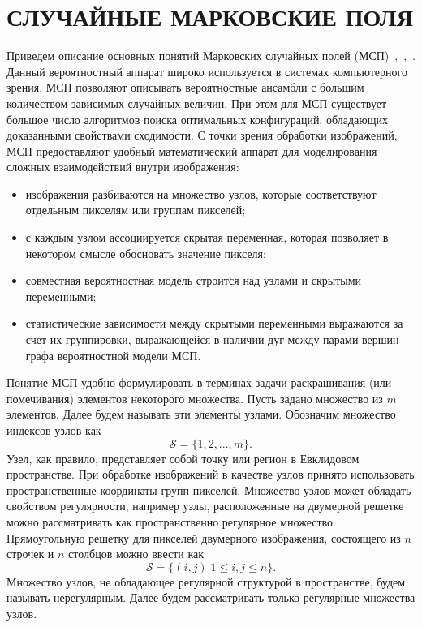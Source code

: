 \chapter{СЛУЧАЙНЫЕ МАРКОВСКИЕ ПОЛЯ}
\label{AppA}

Приведем описание основных понятий Марковских случайных полей (МСП)~\cite{Koller},~\cite{Li:2009:MRF:1529944},~\cite{petyushko2010o-markovskikh3421693}. Данный вероятностный аппарат широко используется в системах компьютерного зрения. МСП позволяют описывать вероятностные ансамбли с большим количеством зависимых случайных величин. При этом для МСП существует большое число алгоритмов поиска оптимальных конфигураций, обладающих доказанными свойствами сходимости. С точки зрения обработки изображений, МСП предоставляют удобный математический аппарат для моделирования сложных взаимодействий внутри изображения:
\begin{itemize}
\item изображения разбиваются на множество узлов, которые соответствуют отдельным пикселям или группам пикселей;
\item с каждым узлом ассоциируется скрытая переменная, которая позволяет в некотором смысле обосновать значение пикселя;
\item совместная вероятностная модель строится над узлами и скрытыми переменными;
\item статистические зависимости между скрытыми переменными выражаются за счет их группировки, выражающейся в наличии дуг между парами вершин графа вероятностной модели МСП.
\end{itemize}

Понятие МСП удобно формулировать в терминах задачи раскрашивания (или помечивания) элементов некоторого множества. Пусть задано множество из $m$ элементов. Далее будем называть эти элементы узлами. Обозначим множество индексов узлов как
\begin{equation*}
\mathcal{S}=\{1,2,...,m\}.
\end{equation*}
Узел, как правило, представляет собой точку или регион в Евклидовом 
пространстве. При обработке изображений в качестве узлов принято использовать 
пространственные координаты групп пикселей. Множество узлов может обладать 
свойством регулярности, например узлы, расположенные на двумерной решетке можно 
рассматривать как пространственно регулярное множество. Прямоугольную решетку 
для пикселей двумерного изображения, состоящего из $n$ строчек и $n$ столбцов 
можно ввести как 
\begin{equation*}
\mathcal{S} = \{ (i,j) \vert 1 \leq i,j \leq n \}.
\end{equation*}
Множество узлов, не обладающее регулярной структурой в пространстве, будем 
называть нерегулярным. Далее будем рассматривать только регулярные множества узлов.

